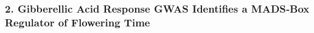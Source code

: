 \documentclass[10pt,letterpaper]{article}
\begin{document}


\subsubsection*{2. Gibberellic Acid Response GWAS Identifies a MADS‑Box Regulator of Flowering Time}
\end{document}

